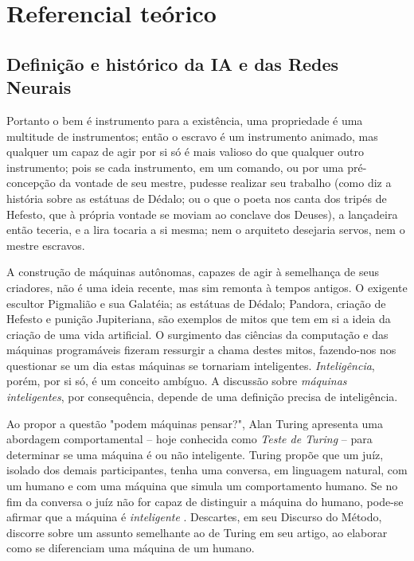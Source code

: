 \documentclass[12pt, a4paper]{article}
\begin{document}
\section{Referencial teórico}
\subsection{Definição e histórico da IA e das Redes Neurais}
\begin{displayquote}
Portanto o bem é instrumento para a existência, uma propriedade é uma multitude de instrumentos; então o escravo é um instrumento animado,
mas qualquer um capaz de agir por si só é mais valioso do que qualquer outro instrumento; pois se cada instrumento, em um comando,
ou por uma pré-concepção da vontade de seu mestre, pudesse realizar seu trabalho (como diz a história sobre as estátuas de Dédalo; ou o que
o poeta nos canta dos tripés de Hefesto, que à própria vontade se moviam ao conclave dos Deuses), a lançadeira então teceria, e a lira
tocaria a si mesma; nem o arquiteto desejaria servos, nem o mestre escravos. \cite{aristotle_politics}
\end{displayquote}

A construção de máquinas autônomas, capazes de agir à semelhança de seus criadores, não é uma ideia recente, mas sim remonta à tempos antigos. 
O exigente escultor Pigmalião e sua Galatéia; as estátuas de Dédalo; Pandora, criação de Hefesto e punição Jupiteriana, 
são exemplos de mitos que tem em si a ideia da criação de uma vida artificial. 
O surgimento das ciências da computação e das máquinas programáveis fizeram ressurgir a chama destes mitos, 
fazendo-nos nos questionar se um dia estas máquinas se tornariam inteligentes. \emph{Inteligência}, porém, por si só, é um conceito ambíguo.
A discussão sobre \emph{máquinas inteligentes}, por consequência, depende de uma definição precisa de inteligência.

Ao propor a questão "podem máquinas pensar?", Alan Turing apresenta uma abordagem comportamental -- hoje conhecida como \emph{Teste de Turing} --
para determinar se uma máquina é ou não inteligente. Turing propõe que um juíz, isolado dos demais participantes,
tenha uma conversa, em linguagem natural, com um humano e com uma máquina que simula um comportamento humano.
Se no fim da conversa o juíz não for capaz de distinguir a máquina do humano, pode-se afirmar que a máquina é \emph{inteligente}
\cite{turing}. Descartes, em seu Discurso do Método, discorre sobre um assunto semelhante ao de Turing em seu artigo, ao elaborar como se diferenciam
uma máquina de um humano.
\end{document}
